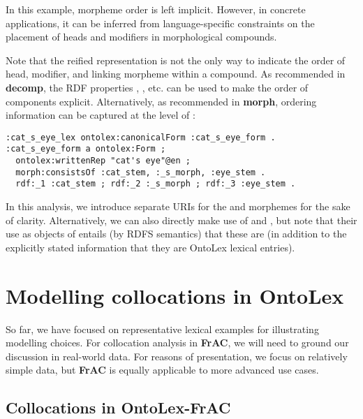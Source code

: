 \documentclass[output=paper,colorlinks,citecolor=brown]{langscibook}
\begin{document}
In this example, morpheme order is left implicit. However, in concrete applications, it can be inferred from language-specific constraints on the placement of heads and modifiers in morphological compounds.

Note that the reified representation is not the only way to indicate the order of head, modifier, and linking morpheme within a compound.
As recommended in \textbf{decomp}, the RDF properties , , etc. can be used to make the order of components explicit. Alternatively, as recommended in \textbf{morph}, ordering information can be captured at the level of :

{\listingsize
\begin{verbatim}
:cat_s_eye_lex ontolex:canonicalForm :cat_s_eye_form .
:cat_s_eye_form a ontolex:Form ;
  ontolex:writtenRep "cat's eye"@en ;
  morph:consistsOf :cat_stem, :_s_morph, :eye_stem .
  rdf:_1 :cat_stem ; rdf:_2 :_s_morph ; rdf:_3 :eye_stem .
\end{verbatim}
}

\noindent
In this analysis, we introduce separate URIs for the  and  morphemes for the sake of clarity. Alternatively, we can also directly make use of  and , but note that their use as objects of  entails (by RDFS semantics) that these are  (in addition to the explicitly stated information that they are OntoLex lexical entries).

\section{Modelling collocations in OntoLex}
So far, we have focused on representative lexical examples for illustrating modelling choices. For collocation analysis in \textbf{FrAC}, we will need to ground our discussion in real-world data. For reasons of presentation, we focus on relatively simple data, but \textbf{FrAC} is equally applicable to more advanced use cases.

\subsection{Collocations in OntoLex-FrAC}\label{section:mwe_context}
\label{section:mwe_frac}
\label{sec-mwe-frac}
\end{document}
